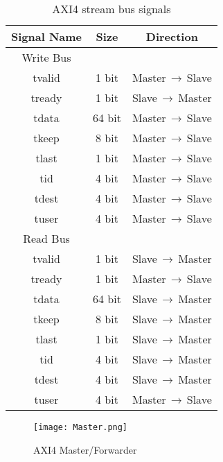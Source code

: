 \documentclass[10pt, conference, compsocconf]{IEEEtran}
\begin{document}
\begin{table}[!htbp]
  \caption{AXI4 stream bus signals}
  \label{tab:AXI4Sig}

  \begin{center}
    \begin{tabular}{|c|c|c|}
      \hline
       Signal Name & Size & Direction\\
      \hline
       Write Bus & & \\
      \hline
       tvalid & 1 bit & Master$\,\to\,$Slave\\
      \hline
       tready & 1 bit & Slave$\,\to\,$Master\\
      \hline
       tdata & 64 bit & Master$\,\to\,$Slave\\
      \hline
       tkeep & 8 bit & Master$\,\to\,$Slave\\
      \hline
       tlast & 1 bit & Master$\,\to\,$Slave\\
      \hline
       tid & 4 bit & Master$\,\to\,$Slave\\
      \hline
       tdest & 4 bit & Master$\,\to\,$Slave\\
      \hline
       tuser & 4 bit & Master$\,\to\,$Slave\\
      \hline      
       Read Bus & & \\
      \hline
       tvalid & 1 bit & Slave$\,\to\,$Master\\
      \hline
       tready & 1 bit & Master$\,\to\,$Slave\\
      \hline
       tdata & 64 bit & Slave$\,\to\,$Master\\
      \hline
       tkeep & 8 bit & Slave$\,\to\,$Master\\
      \hline
       tlast & 1 bit & Slave$\,\to\,$Master\\
      \hline
       tid & 4 bit & Slave$\,\to\,$Master\\
      \hline
       tdest & 4 bit & Slave$\,\to\,$Master\\
      \hline
       tuser & 4 bit & Master$\,\to\,$Slave\\
      \hline      
    \end{tabular}
  \end{center}
\end{table}

\begin{figure}[!htbp]
  \begin{center}
    \texttt{[image: Master.png]}
    \caption{AXI4 Master/Forwarder}
    \label{fig:Master}
  \end{center}
\end{figure}
\end{document}
